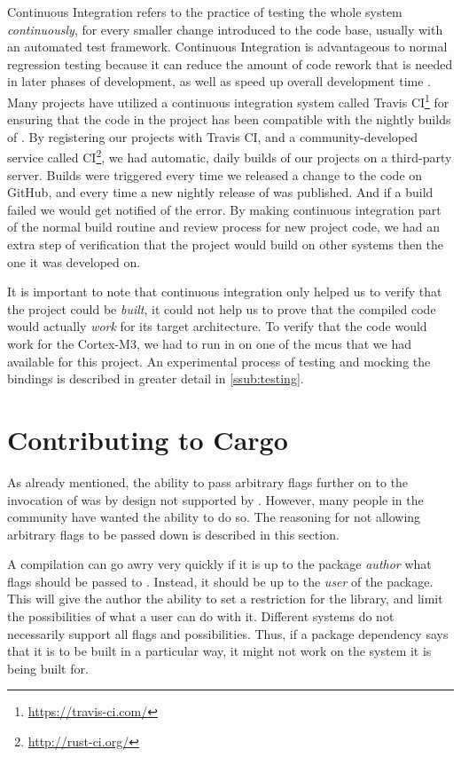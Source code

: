 Continuous Integration refers to the practice of testing the whole system \emph{continuously}, for every smaller change introduced to the code base, usually with an automated test framework.
Continuous Integration is advantageous to normal regression testing because it can reduce the amount of code rework that is needed in later phases of development, as well as speed up overall development time  \cite{Orso2014}.
Many {\rust} projects have utilized a continuous integration system called Travis CI\footnote{\url{https://travis-ci.com/}} for ensuring that the code in the project has been compatible with the nightly builds of {\rust}.
By registering our projects with Travis CI, and a community-developed service called {\rust} CI\footnote{\url{http://rust-ci.org/}}, we had automatic, daily builds of our projects on a third-party server.
Builds were triggered every time we released a change to the code on GitHub, and every time a new nightly release of {\rust} was published.
And if a build failed we would get notified of the error.
By making continuous integration part of the normal build routine and review process for new project code, we had an extra step of verification that the project would build on other systems then the one it was developed on.

It is important to note that continuous integration only helped us to verify that the project could be \emph{built}, it could not help us to prove that the compiled code would actually \emph{work} for its target architecture.
To verify that the code would work for the Cortex-M3, we had to run in on one of the \glspl{mcu} that we had available for this project.
An experimental process of testing and mocking the {\rg} bindings is described in greater detail in \autoref{ssub:testing}.

\section{Contributing to Cargo}
\label{ssub:contributing_to_cargo}

As already mentioned, the ability to pass arbitrary flags further on to the invocation of {\rustc} was by design not supported by {\cargo}.
However, many people in the {\rust} community have wanted the ability to do so.
The reasoning for not allowing arbitrary flags to be passed down is described in this section.

A compilation can go awry very quickly if it is up to the package \emph{author} what flags should be passed to {\rustc}.
Instead, it should be up to the \emph{user} of the package.
This will give the author the ability to set a restriction for the library, and limit the possibilities of what a user can do with it.
Different systems do not necessarily support all flags and possibilities.
Thus, if a package dependency says that it is to be built in a particular way, it might not work on the system it is being built for.

